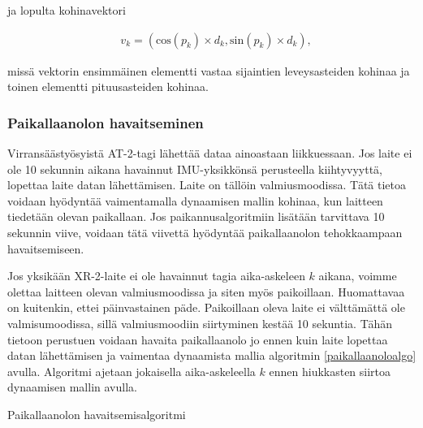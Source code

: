 \documentclass[
  12pt,
  a4paper, twoside]{book}
\begin{document}
\noindent ja lopulta kohinavektori

\begin{align}
&v_k = (\text{cos}(p_k) \times d_k, \text{sin}(p_k) \times d_k),
\end{align}

\noindent missä vektorin ensimmäinen elementti vastaa sijaintien leveysasteiden kohinaa ja toinen elementti pituusasteiden kohinaa.

\subsubsection{Paikallaanolon havaitseminen}\label{paikallaanolon-havaitseminen}

Virransäästyösyistä AT-2-tagi lähettää dataa ainoastaan liikkuessaan. Jos laite ei ole 10 sekunnin aikana havainnut IMU-yksikkönsä perusteella kiihtyvyyttä, lopettaa laite datan lähettämisen. Laite on tällöin valmiusmoodissa. Tätä tietoa voidaan hyödyntää vaimentamalla dynaamisen mallin kohinaa, kun laitteen tiedetään olevan paikallaan. Jos paikannusalgoritmiin lisätään tarvittava 10 sekunnin viive, voidaan tätä viivettä hyödyntää paikallaanolon tehokkaampaan havaitsemiseen.

Jos yksikään XR-2-laite ei ole havainnut tagia aika-askeleen \(k\) aikana, voimme olettaa laitteen olevan valmiusmoodissa ja siten myös paikoillaan. Huomattavaa on kuitenkin, ettei päinvastainen päde. Paikoillaan oleva laite ei välttämättä ole valmisumoodissa, sillä valmiusmoodiin siirtyminen kestää 10 sekuntia. Tähän tietoon perustuen voidaan havaita paikallaanolo jo ennen kuin laite lopettaa datan lähettämisen ja vaimentaa dynaamista mallia algoritmin \ref{paikallaanoloalgo} avulla. Algoritmi ajetaan jokaisella aika-askeleella \(k\) ennen hiukkasten siirtoa dynaamisen mallin avulla.

\begin{algorithm}[H]
\label{paikallaanoloalgo}
\DontPrintSemicolon
\SetAlgoShortEnd
{}
\caption{Paikallaanolon havaitsemisalgoritmi}
\end{algorithm}
\end{document}
